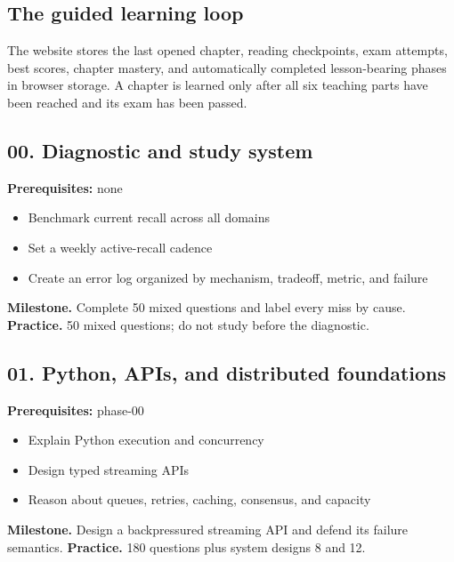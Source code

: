 \subsection{The guided learning loop}
\begin{center}\end{center}
The website stores the last opened chapter, reading checkpoints, exam attempts, best scores, chapter mastery, and automatically completed lesson-bearing phases in browser storage. A chapter is learned only after all six teaching parts have been reached and its exam has been passed.
\subsection{00. Diagnostic and study system}
 \quad \textbf{Prerequisites:} none
\begin{itemize}
\item Benchmark current recall across all domains
\item Set a weekly active-recall cadence
\item Create an error log organized by mechanism, tradeoff, metric, and failure
\end{itemize}
\textbf{Milestone.} Complete 50 mixed questions and label every miss by cause.
\textbf{Practice.} 50 mixed questions; do not study before the diagnostic.
\subsection{01. Python, APIs, and distributed foundations}
 \quad \textbf{Prerequisites:} phase-00
\begin{itemize}
\item Explain Python execution and concurrency
\item Design typed streaming APIs
\item Reason about queues, retries, caching, consensus, and capacity
\end{itemize}
\textbf{Milestone.} Design a backpressured streaming API and defend its failure semantics.
\textbf{Practice.} 180 questions plus system designs 8 and 12.
